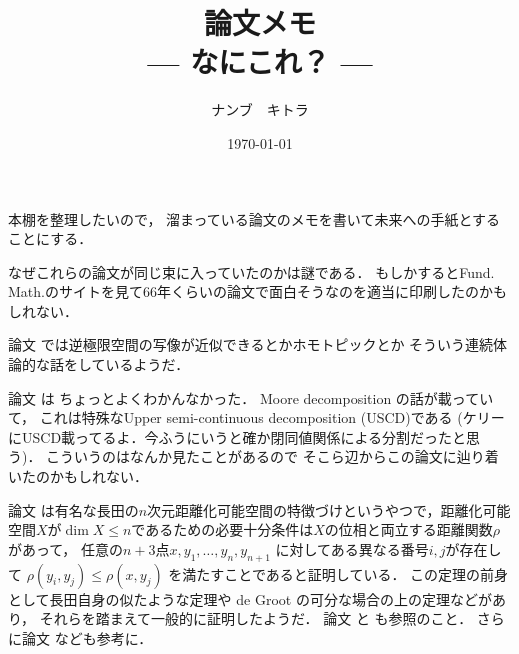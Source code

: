 \documentclass[leqno, a4paper, 12pt]{jsarticle}
\title{論文メモ
\large{\\--- なにこれ？ ---}
}
\author{ナンブ　キトラ}
\date{\today}
\begin{document}
\maketitle

本棚を整理したいので，
溜まっている論文のメモを書いて未来への手紙とすることにする．

なぜこれらの論文が同じ束に入っていたのかは謎である．
もしかするとFund. Math.のサイトを見て66年くらいの論文で面白そうなのを適当に印刷したのかもしれない．

論文
\cite{MR0202117}
では逆極限空間の写像が近似できるとかホモトピックとか
そういう連続体論的な話をしているようだ．



論文
\cite{MR0200910}
は
ちょっとよくわかんなかった．
Moore decomposition 
の話が載っていて，
これは特殊なUpper semi-continuous decomposition (USCD)である
(ケリーにUSCD載ってるよ．今ふうにいうと確か閉同値関係による分割だったと思う)．
こういうのはなんか見たことがあるので
そこら辺からこの論文に辿り着いたのかもしれない．


論文
\cite{MR0180956}
は有名な長田の$n$次元距離化可能空間の特徴づけというやつで，距離化可能空間$X$が$\dim X\le n$であるための必要十分条件は$X$の位相と両立する距離関数$\rho$があって，
任意の$n+3$点$x, y_{1}, \dots, y_{n}, y_{n+1}$
に対してある異なる番号$i, j$が存在して
$\rho(y_{i}, y_{j})\le \rho(x, y_{j})$
を満たすことであると証明している．
この定理の前身として長田自身の似たような定理や
de Groot の可分な場合の上の定理などがあり，
それらを踏まえて一般的に証明したようだ．
論文
\cite{MR2666207}
と
\cite{MR1906836}
も参照のこと．
さらに論文
\cite{MR0982791}
\cite{MR0086284}
\cite{MR0180957}
\cite{MR0164320}
なども参考に．





\nocite{*}


\end{document}
